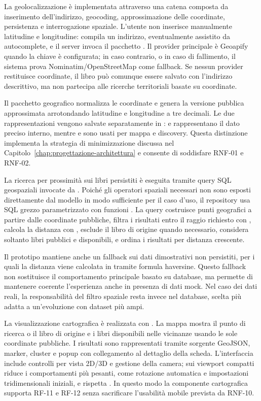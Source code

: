 La geolocalizzazione è implementata attraverso una catena composta da inserimento dell'indirizzo, geocoding, approssimazione delle coordinate, persistenza e interrogazione spaziale. L'utente non inserisce manualmente latitudine e longitudine: compila un indirizzo, eventualmente assistito da autocomplete, e il server invoca il pacchetto . Il provider principale è Geoapify quando la chiave è configurata; in caso contrario, o in caso di fallimento, il sistema prova Nominatim/OpenStreetMap come fallback. Se nessun provider restituisce coordinate, il libro può comunque essere salvato con l'indirizzo descrittivo, ma non partecipa alle ricerche territoriali basate su coordinate.

Il pacchetto geografico normalizza le coordinate e genera la versione pubblica approssimata arrotondando latitudine e longitudine a tre decimali. Le due rappresentazioni vengono salvate separatamente in :  e  rappresentano il dato preciso interno, mentre  e  sono usati per mappa e discovery. Questa distinzione implementa la strategia di minimizzazione discussa nel Capitolo~\ref{chap:progettazione-architettura} e consente di soddisfare RNF-01 e RNF-02.

La ricerca per prossimità sui libri persistiti è eseguita tramite query SQL geospaziali invocate da \prisma{}. Poiché gli operatori spaziali necessari non sono esposti direttamente dal modello \prisma{} in modo sufficiente per il caso d'uso, il repository usa SQL grezzo parametrizzato con funzioni \postgis{}. La query costruisce punti geografici a partire dalle coordinate pubbliche, filtra i risultati entro il raggio richiesto con , calcola la distanza con , esclude il libro di origine quando necessario, considera soltanto libri pubblici e disponibili, e ordina i risultati per distanza crescente.

Il prototipo mantiene anche un fallback sui dati dimostrativi non persistiti, per i quali la distanza viene calcolata in \typescript{} tramite formula haversine. Questo fallback non sostituisce il comportamento principale basato su database, ma permette di mantenere coerente l'esperienza anche in presenza di dati mock. Nel caso dei dati reali, la responsabilità del filtro spaziale resta invece nel database, scelta più adatta a un'evoluzione con dataset più ampi.

La visualizzazione cartografica è realizzata con \maplibre{}. La mappa mostra il punto di ricerca o il libro di origine e i libri disponibili nelle vicinanze usando le sole coordinate pubbliche. I risultati sono rappresentati tramite sorgente GeoJSON, marker, cluster e popup con collegamento al dettaglio della scheda. L'interfaccia include controlli per vista 2D/3D e gestione della camera; sui viewport compatti riduce i comportamenti più pesanti, come rotazione automatica e impostazioni tridimensionali iniziali, e rispetta . In questo modo la componente cartografica supporta RF-11 e RF-12 senza sacrificare l'usabilità mobile prevista da RNF-10.

